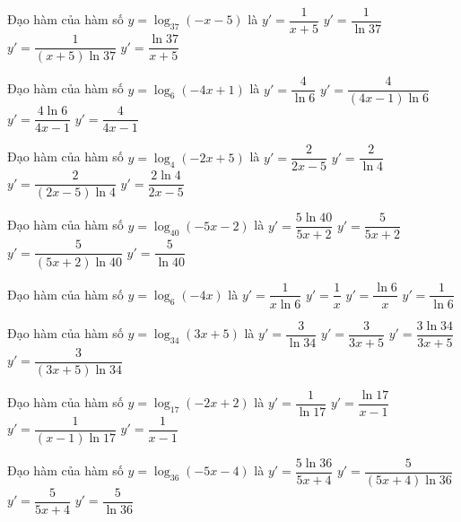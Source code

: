\documentclass[12pt,a4paper]{article}
\begin{document}
\begin{ex}
Đạo hàm của hàm số $y=\log_{37}(-x-5)$ là
\choice
{$y'=\dfrac{1}{x+5}$}
{$y'=\dfrac{1}{\ln{37}}$}
{\True $y'=\dfrac{1}{(x+5)\ln 37}$}
{$y'=\dfrac{\ln{37}}{x+5}$}
\end{ex}
\begin{ex}
Đạo hàm của hàm số $y=\log_6(-4x+1)$ là
\choice
{$y'=\dfrac{4}{\ln{6}}$}
{\True $y'=\dfrac{4}{(4x-1)\ln 6}$}
{$y'=\dfrac{4\ln{6}}{4x-1}$}
{$y'=\dfrac{4}{4x-1}$}
\end{ex}
\begin{ex}
Đạo hàm của hàm số $y=\log_4(-2x+5)$ là
\choice
{$y'=\dfrac{2}{2x-5}$}
{$y'=\dfrac{2}{\ln{4}}$}
{\True $y'=\dfrac{2}{(2x-5)\ln 4}$}
{$y'=\dfrac{2\ln{4}}{2x-5}$}
\end{ex}
\begin{ex}
Đạo hàm của hàm số $y=\log_{40}(-5x-2)$ là
\choice
{$y'=\dfrac{5\ln{40}}{5x+2}$}
{$y'=\dfrac{5}{5x+2}$}
{\True $y'=\dfrac{5}{(5x+2)\ln 40}$}
{$y'=\dfrac{5}{\ln{40}}$}
\end{ex}
\begin{ex}
Đạo hàm của hàm số $y=\log_6(-4x)$ là
\choice
{\True $y'=\dfrac{1}{x\ln 6}$}
{$y'=\dfrac{1}{x}$}
{$y'=\dfrac{\ln{6}}{x}$}
{$y'=\dfrac{1}{\ln{6}}$}
\end{ex}
\begin{ex}
Đạo hàm của hàm số $y=\log_{34}(3x+5)$ là
\choice
{$y'=\dfrac{3}{\ln{34}}$}
{$y'=\dfrac{3}{3x+5}$}
{$y'=\dfrac{3\ln{34}}{3x+5}$}
{\True $y'=\dfrac{3}{(3x+5)\ln 34}$}
\end{ex}
\begin{ex}
Đạo hàm của hàm số $y=\log_{17}(-2x+2)$ là
\choice
{$y'=\dfrac{1}{\ln{17}}$}
{$y'=\dfrac{\ln{17}}{x-1}$}
{\True $y'=\dfrac{1}{(x-1)\ln 17}$}
{$y'=\dfrac{1}{x-1}$}
\end{ex}
\begin{ex}
Đạo hàm của hàm số $y=\log_{36}(-5x-4)$ là
\choice
{$y'=\dfrac{5\ln{36}}{5x+4}$}
{\True $y'=\dfrac{5}{(5x+4)\ln 36}$}
{$y'=\dfrac{5}{5x+4}$}
{$y'=\dfrac{5}{\ln{36}}$}
\end{ex}
\end{document}
